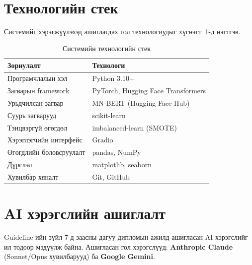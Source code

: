 \section{Технологийн стек}

Системийг хэрэгжүүлэхэд ашиглагдах гол технологиудыг хүснэгт~\ref{tab:tech-stack}-д нэгтгэв.

\begin{table}[H]
\centering
\caption{Системийн технологийн стек}
\label{tab:tech-stack}
\begin{tabular}{@{}ll@{}}
\toprule
\textbf{Зориулалт} & \textbf{Технологи} \\
\midrule
Програмчлалын хэл       & Python 3.10+ \\
Загварын framework       & PyTorch, Hugging Face Transformers \\
Урьдчилсан загвар       & MN-BERT (Hugging Face Hub) \\
Суурь загварууд          & scikit-learn \cite{pedregosa2011} \\
Тэнцвэргүй өгөгдөл      & imbalanced-learn (SMOTE) \\
Хэрэглэгчийн интерфейс  & Gradio \\
Өгөгдлийн боловсруулалт  & pandas, NumPy \\
Дүрслэл                  & matplotlib, seaborn \\
Хувилбар хяналт          & Git, GitHub \\
\bottomrule
\end{tabular}
\end{table}

\section{AI хэрэгслийн ашиглалт}
\label{sec:ai-disclosure}

Guideline-ийн зүйл 7-д заасны дагуу дипломын ажилд ашигласан AI хэрэгслийг
ил тодоор мэдүүлж байна. Ашигласан гол хэрэгслүүд: \textbf{Anthropic Claude}
(Sonnet/Opus хувилбарууд) ба \textbf{Google Gemini}.

